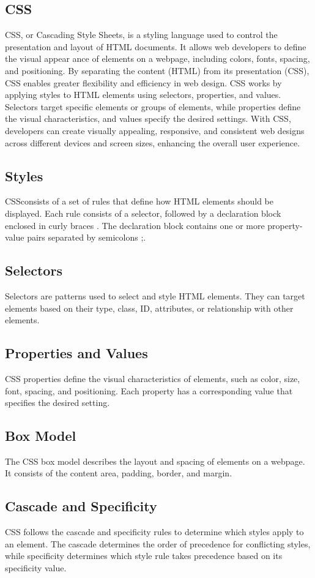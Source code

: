 \subsection{CSS} CSS, or Cascading Style Sheets, is a styling language used to control the presentation
and layout of HTML documents. It allows web developers to define the visual appear
ance of elements on a webpage, including colors, fonts, spacing, and positioning. By separating the content (HTML) from its presentation (CSS), CSS enables greater flexibility and efficiency in web design. CSS works by applying styles to HTML elements using selectors, properties, and values. Selectors target specific elements or groups of elements, while properties define the visual characteristics, and values specify the desired settings. With CSS, developers can create visually appealing, responsive, and consistent web designs across different devices and screen sizes, enhancing the overall user experience.
\subsection*{Styles} CSSconsists of a set of rules that define how HTML elements should be displayed. Each
rule consists of a selector, followed by a declaration block enclosed in curly braces {}. The declaration block contains one or more property-value pairs separated by  semicolons ;.
\subsection*{Selectors} 
Selectors are patterns used to select and style HTML elements. They can target elements based on their type, class, ID, attributes, or relationship with other elements.
\subsection*{Properties and Values} CSS properties define the visual characteristics of elements, such as color, size, font,
spacing, and positioning. Each property has a corresponding value that specifies the
desired setting.
\subsection*{Box Model} The CSS box model describes the layout and spacing of elements on a webpage. It consists of the content area, padding, border, and margin.
\subsection*{Cascade and Specificity}  CSS follows the cascade and specificity rules to determine which styles apply to an
element. The cascade determines the order of precedence for conflicting styles, while specificity determines which style rule takes precedence based on its specificity value.
